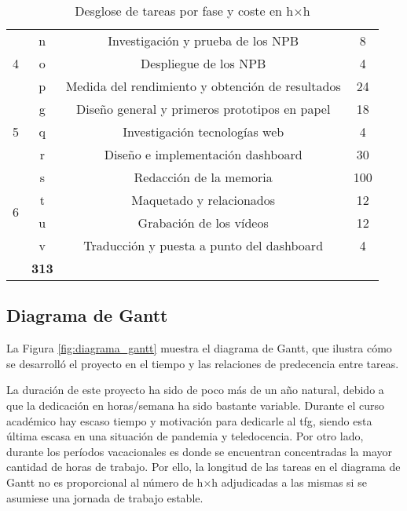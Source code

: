 \begin{table}[htpb]
\begin{tabular}{ |c|c|c|c| }
  \multirow{3}{*}{4}        & n     & {Investigación y prueba de los NPB}                                       & 8 \\\cline{2-4}
                            & o     & {Despliegue de los NPB}                                                  & 4 \\\cline{2-4}
                            & p     & {Medida del rendimiento y obtención de resultados}                        & 24 \\
  \hline
  \multirow{3}{*}{5}        & g     & {Diseño general y primeros prototipos en papel}                           & 18 \\\cline{2-4}
                            & q     & {Investigación tecnologías web}                                           & 4 \\\cline{2-4}
                            & r     & {Diseño e implementación dashboard}                                       & 30 \\
  \hline
  \multirow{4}{*}{6}        & s     & {Redacción de la memoria}                                                 & 100 \\\cline{2-4}
                            & t     & {Maquetado y relacionados}                                                & 12 \\\cline{2-4}
                            & u     & {Grabación de los vídeos}                                                 & 12 \\\cline{2-4}
                            & v     & {Traducción y puesta a punto del dashboard}                               & 4 \\
  \hhline{|=|=|=|=|}
  \multicolumn{3}{|c|}{\textbf{Total}}                                                                          & \textbf{313}\\
  \hline
  \end{tabular}
  \caption{Desglose de tareas por fase y coste en h$\times$h}
  \label{tab:desglose_de_tareas}
\end{table}

\subsection{Diagrama de Gantt}
La Figura \ref{fig:diagrama_gantt} muestra el diagrama de Gantt, que ilustra cómo se desarrolló el proyecto en el tiempo y las relaciones de predecencia entre tareas.

La duración de este proyecto ha sido de poco más de un año natural, debido a que la dedicación en horas/semana ha sido bastante variable. Durante el curso académico hay escaso tiempo y motivación para dedicarle al \acrshort{tfg}, siendo esta última escasa en una situación de pandemia y teledocencia. Por otro lado, durante los períodos vacacionales es donde se encuentran concentradas la mayor cantidad de horas de trabajo. Por ello, la longitud de las tareas en el diagrama de Gantt no es proporcional al número de h$\times$h adjudicadas a las mismas si se asumiese una jornada de trabajo estable.

